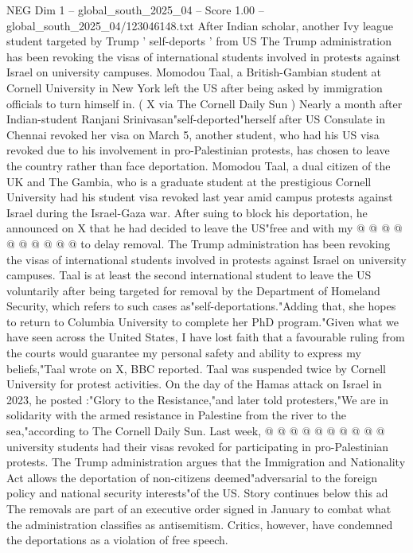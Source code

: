 \begin{textsample}{NEG Dim 1 – global\_south\_2025\_04 – Score 1.00 – global\_south\_2025\_04/123046148.txt}  \label{ex:f1_neg_161}
After Indian scholar, another Ivy league student targeted by Trump ' self-deports ' from US The Trump administration has been revoking the visas of international students involved in protests against Israel on university campuses.
Momodou Taal, a British-Gambian student at Cornell University in New York left the US after being asked by immigration officials to turn himself in. ( X via The Cornell Daily Sun ) Nearly a month after Indian-student Ranjani Srinivasan"self-deported"herself after US Consulate in Chennai revoked her visa on March 5, another student, who had his US visa revoked due to his involvement in pro-Palestinian protests, has chosen to leave the country rather than face deportation.
Momodou Taal, a dual citizen of the UK and The Gambia, who is a graduate student at the prestigious Cornell University had his student visa revoked last year amid campus protests against Israel during the Israel-Gaza war.
After suing to block his deportation, he announced on X that he had decided to leave the US"free and with my @ @ @ @ @ @ @ @ @ @ to delay removal.
The Trump administration has been revoking the visas of international students involved in protests against Israel on university campuses.
Taal is at least the second international student to leave the US voluntarily after being targeted for removal by the Department of Homeland Security, which refers to such cases as"self-deportations."Adding that, she hopes to return to Columbia University to complete her PhD program."Given what we have seen across the United States, I have lost faith that a favourable ruling from the courts would guarantee my personal safety and ability to express my beliefs,"Taal wrote on X, BBC reported.
Taal was suspended twice by Cornell University for protest activities.
On the day of the Hamas attack on Israel in 2023, he posted :"Glory to the Resistance,"and later told protesters,"We are in solidarity with the armed resistance in Palestine from the river to the sea,"according to The Cornell Daily Sun.
Last week, @ @ @ @ @ @ @ @ @ @ university students had their visas revoked for participating in pro-Palestinian protests.
The Trump administration argues that the Immigration and Nationality Act allows the deportation of non-citizens deemed"adversarial to the foreign policy and national security interests"of the US.
Story continues below this ad The removals are part of an executive order signed in January to combat what the administration classifies as antisemitism.
Critics, however, have condemned the deportations as a violation of free speech.

\end{textsample}
